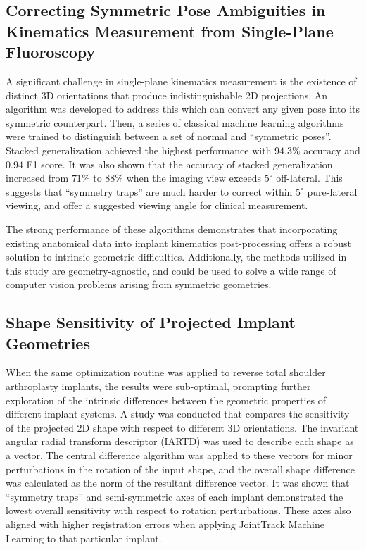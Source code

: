 \subsection{Correcting Symmetric Pose Ambiguities in Kinematics Measurement from Single-Plane Fluoroscopy}
A significant challenge in single-plane kinematics measurement is the existence of distinct 3D orientations that produce indistinguishable 2D projections.
An algorithm was developed to address this which can convert any given pose into its symmetric counterpart.
Then, a series of classical machine learning algorithms were trained to distinguish between a set of normal and ``symmetric poses''.
Stacked generalization achieved the highest performance with $94.3\%$ accuracy and $0.94$ F1 score.
It was also shown that the accuracy of stacked generalization increased from $71\%$ to $88\%$ when the imaging view exceeds $5^{\circ}$ off-lateral.
This suggests that ``symmetry traps'' are much harder to correct within $5^{\circ}$ pure-lateral viewing, and offer a suggested viewing angle for clinical measurement.

The strong performance of these algorithms demonstrates that incorporating existing anatomical data into implant kinematics post-processing offers a robust solution to intrinsic geometric difficulties.
Additionally, the methods utilized in this study are geometry-agnostic, and could be used to solve a wide range of computer vision problems arising from symmetric geometries.

\subsection{Shape Sensitivity of Projected Implant Geometries}
When the same optimization routine was applied to reverse total shoulder arthroplasty implants, the results were sub-optimal, prompting further exploration of the intrinsic differences between the geometric properties of different implant systems.
A study was conducted that compares the sensitivity of the projected 2D shape with respect to different 3D orientations.
The invariant angular radial transform descriptor (IARTD) was used to describe each shape as a vector.
The central difference algorithm was applied to these vectors for minor perturbations in the rotation of the input shape, and the overall shape difference was calculated as the norm of the resultant difference vector.
It was shown that ``symmetry traps'' and semi-symmetric axes of each implant demonstrated the lowest overall sensitivity with respect to rotation perturbations.
These axes also aligned with higher registration errors when applying JointTrack Machine Learning to that particular implant.

